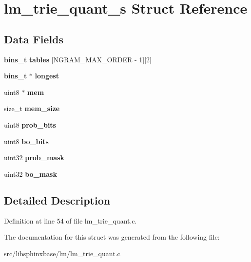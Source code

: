 \section{lm\+\_\+trie\+\_\+quant\+\_\+s Struct Reference}
\label{structlm__trie__quant__s}
\subsection*{Data Fields}
\begin{DoxyCompactItemize}
\item 
\mbox{\label{structlm__trie__quant__s_ad0c255a6af8c121e154bafd6d4eb023b}} 
\textbf{ bins\+\_\+t} {\bfseries tables} [N\+G\+R\+A\+M\+\_\+\+M\+A\+X\+\_\+\+O\+R\+D\+ER -\/ 1][2]
\item 
\mbox{\label{structlm__trie__quant__s_a218f78c52d512605133668b765e3260b}} 
\textbf{ bins\+\_\+t} $\ast$ {\bfseries longest}
\item 
\mbox{\label{structlm__trie__quant__s_add104d4880f471d73fd886b2eae7ca66}} 
uint8 $\ast$ {\bfseries mem}
\item 
\mbox{\label{structlm__trie__quant__s_a348c9280b8fccbac99890a5bf3a69d94}} 
size\+\_\+t {\bfseries mem\+\_\+size}
\item 
\mbox{\label{structlm__trie__quant__s_a3696f006dc23c7faddd81419aae4de64}} 
uint8 {\bfseries prob\+\_\+bits}
\item 
\mbox{\label{structlm__trie__quant__s_a7d8ec82f7dde68d7a7e4ea495972bddc}} 
uint8 {\bfseries bo\+\_\+bits}
\item 
\mbox{\label{structlm__trie__quant__s_ad70aed4374709125a85a915815538a61}} 
uint32 {\bfseries prob\+\_\+mask}
\item 
\mbox{\label{structlm__trie__quant__s_a2b8c82b5f452346651055c0cd7a3b3f2}} 
uint32 {\bfseries bo\+\_\+mask}
\end{DoxyCompactItemize}


\subsection{Detailed Description}


Definition at line 54 of file lm\+\_\+trie\+\_\+quant.\+c.



The documentation for this struct was generated from the following file\+:\begin{DoxyCompactItemize}
\item 
src/libsphinxbase/lm/lm\+\_\+trie\+\_\+quant.\+c\end{DoxyCompactItemize}

